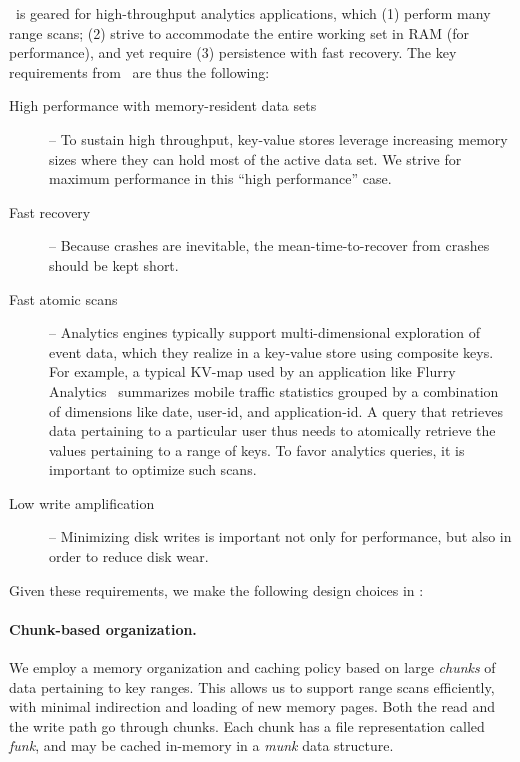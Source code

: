 
\sys\ is geared for high-throughput analytics applications, which (1) perform many range scans; 
(2) strive to accommodate the entire working set in RAM (for performance), and yet require  (3)
persistence with fast recovery. 
The key requirements from \sys\ are thus the following:
\begin{description}
\item[High performance with memory-resident data sets] -- 
To sustain high throughput, key-value stores leverage increasing memory sizes where they can hold most of the active data set. 
We strive for maximum performance in this ``high performance'' case.  
\item[Fast recovery] --  Because crashes are inevitable, the mean-time-to-recover from crashes should be kept short.
 \item[Fast atomic scans] -- 
 Analytics engines typically support multi-dimensional exploration of event data, which they realize in a key-value store using composite keys.   For example, a typical  KV-map used by an application like Flurry Analytics~\cite{flurry} 
  summarizes mobile traffic statistics grouped by a combination of dimensions like  date,  user-id, and application-id.
A query that retrieves data pertaining to a particular user thus needs to atomically 
retrieve the values pertaining to a range of keys. 
 To favor analytics queries, it is important to optimize  such scans. 
 \item[Low write amplification] -- Minimizing disk writes is important not only for performance, but also in order to reduce disk wear.

\end{description} 



Given these requirements, we make the following design choices in \sys:
\paragraph{Chunk-based organization.} We employ a memory organization and caching policy based on large \emph{chunks} of data pertaining to key ranges.  This allows us to support 
 range scans efficiently, with minimal indirection and loading of new memory pages. 
Both the read and the write path go through chunks. 
Each chunk has a file representation called  \emph{funk}, and may be cached 
in-memory in a  \emph{munk} data structure.
